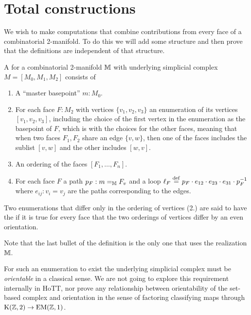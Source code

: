 \section{Total constructions}
We wish to make computations that combine contributions from every face of a combinatorial 2-manifold. To do this we will add some structure and then prove that the definitions are independent of that structure.

\begin{mydef}
A  for a combinatorial 2-manifold \( \mathbb{M} \) with underlying simplicial complex \( M=[M_0, M_1, M_2] \) consists of
\begin{enumerate}
\item A ``master basepoint'' \( m:M_0 \).
\item For each face \( F:M_2 \) with vertices \( \{v_1, v_2, v_3\} \) an enumeration of its vertices \( [v_1, v_2, v_3] \), including the choice of the first vertex in the enumeration as the basepoint of \( F \), which is  with the choices for the other faces, meaning that when two faces \( F_1,F_2 \) share an edge \( \{v, w\} \), then one of the faces includes the sublist \( [v, w] \) and the other includes \( [w, v] \).
\item An ordering of the faces \( [F_1,\ldots,F_n] \).
\item For each face \( F \) a path \( p_F:m=_{\mathbb{M}} F_v \) and a loop \( \ell_F\stackrel{\mathrm{def}}{=} p_F\cdot e_{12}\cdot e_{23}\cdot e_{31}\cdot p_F^{-1} \) where \( e_{ij}:v_i=v_j \) are the paths corresponding to the edges. 
\end{enumerate}
Two enumerations that differ only in the ordering of vertices (2.) are said to have the  if it is true for every face that the two orderings of vertices differ by an even orientation.
\end{mydef}

Note that the last bullet of the definition is the only one that uses the realization \( \mathbb{M} \).

\begin{mynote}
For such an enumeration to exist the underlying simplicial complex must be \emph{orientable} in a classical sense. We are not going to explore this requirement internally in HoTT, nor prove any relationship between orientability of the set-based complex and orientation in the sense of factoring classifying maps through \( \mathrm{K}(\mathbb{Z},2)\to\mathrm{EM}(\mathbb{Z},1) \).
\end{mynote}

